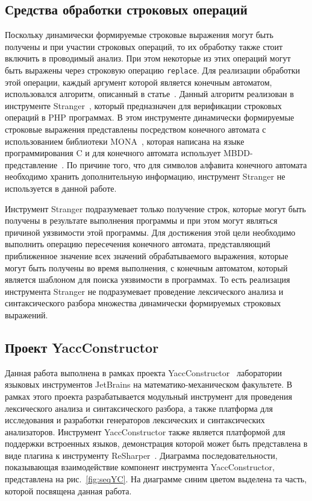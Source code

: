 \subsection{Средства обработки строковых операций}

Поскольку динамически формируемые строковые выражения могут быть получены и при участии строковых операций, то их обработку также стоит включить в проводимый анализ. При этом некоторые из этих операций могут быть выражены через строковую операцию \verb|replace|. Для реализации обработки этой операции, каждый аргумент которой является конечным автоматом, использовался алгоритм, описанный в статье~\cite{ReplaceFangYu}. Данный алгоритм реализован в инструменте Stranger~\cite{StrangerFangYu}, который предназначен для верификации строковых операций в PHP программах. В этом инструменте динамически формируемые строковые выражения представлены посредством конечного автомата с использованием библиотеки MONA~\cite{MONAUrl}, которая написана на языке программирования C и для конечного автомата использует MBDD-представление~\cite{MBDD}. По причине того, что для символов алфавита конечного автомата необходимо хранить дополнительную информацию, инструмент Stranger не используется в данной работе.

Инструмент Stranger подразумевает только получение строк, которые могут быть получены в результате выполнения программы и при этом могут являться причиной уязвимости этой программы. Для достижения этой цели необходимо выполнить операцию пересечения конечного автомата, представляющий приближенное значение всех значений обрабатываемого выражения, которые могут быть получены во время выполнения, с конечным автоматом, который является шаблоном для поиска уязвимости в программах. То есть реализация инструмента Stranger не подразумевает проведение лексического анализа и синтаксического разбора множества динамически формируемых строковых выражений.

\subsection{Проект YaccConstructor}

Данная работа выполнена в рамках проекта YaccConstructor~\cite{YCUrl} лаборатории языковых инструментов JetBrains на математико-механическом факультете. В рамках этого проекта разрабатывается модульный инструмент для проведения лексического анализа и синтаксического разбора, а также платформа для исследования и разработки генераторов лексических и синтаксических анализаторов. Инструмент YaccConstructor также является платформой для поддержки встроенных языков, демонстрация которой может быть представлена в виде плагина к инструменту ReSharper~\cite{ReSharper}. Диаграмма последовательности, показывающая взаимодействие компонент инструмента YaccConstructor, представлена на рис.~\ref{fig:seqYC}. На диаграмме синим цветом выделена та часть, которой посвящена данная работа. 

